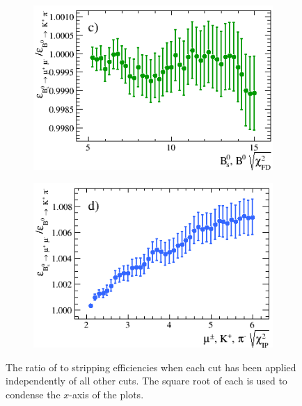 \begin{figure}[tbp]
    \begin{subfigure}[b]{0.48\textwidth}
        \includegraphics[width=\textwidth]{./Figs/Selection/Bs2MuMu_KPi_FD.png}
        \label{fig:FD_ratioKPi}
    \end{subfigure}
   \begin{subfigure}[b]{0.48\textwidth}
        \includegraphics[width=\textwidth]{./Figs/Selection/Bs2MuMu_KPi_daughter_IP.png}
        \label{fig:IPS_ratioKPi}
    \end{subfigure}
    \caption{The ratio of \bsmumu to \bdkpi stripping efficiencies when each cut has been applied independently of all other cuts. The square root of each \chisqd is used to condense the $x$-axis of the plots.}
    \label{fig:ratio_plotsBd2KPi}
\end{figure}


